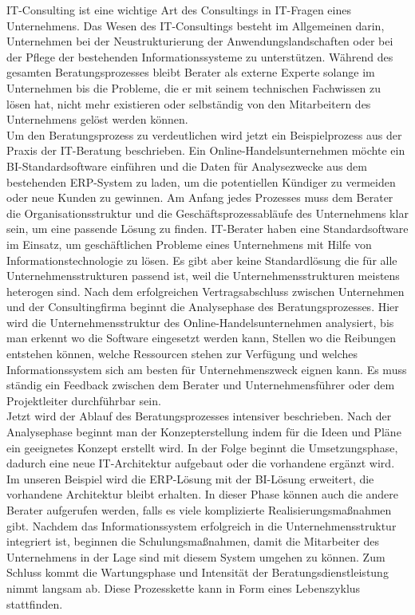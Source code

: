 	IT-Consulting ist eine wichtige Art des Consultings in IT-Fragen eines Unternehmens. Das Wesen des IT-Consultings besteht im Allgemeinen darin, Unternehmen bei der Neustrukturierung der Anwendungslandschaften oder bei der Pflege der bestehenden Informationssysteme zu unterstützen. Während des gesamten Beratungsprozesses bleibt Berater als externe Experte solange im Unternehmen bis die Probleme, die er mit seinem technischen Fachwissen zu lösen hat, nicht mehr existieren oder selbständig von den Mitarbeitern des Unternehmens gelöst werden können.\\
	Um den Beratungsprozess zu verdeutlichen wird jetzt ein Beispielprozess aus der Praxis der IT-Beratung beschrieben. Ein Online-Handelsunternehmen möchte ein BI-Standardsoftware einführen und die Daten für Analysezwecke aus dem bestehenden ERP-System zu laden, um die potentiellen Kündiger zu vermeiden oder neue Kunden zu gewinnen. Am Anfang jedes Prozesses muss dem Berater die Organisationsstruktur und die Geschäftsprozessabläufe des Unternehmens klar sein, um eine passende Lösung zu finden. IT-Berater haben eine Standardsoftware im Einsatz, um geschäftlichen Probleme eines Unternehmens mit Hilfe von Informationstechnologie zu lösen. Es gibt aber keine Standardlösung die für alle Unternehmensstrukturen passend ist, weil die Unternehmensstrukturen meistens heterogen sind. Nach dem erfolgreichen Vertragsabschluss zwischen Unternehmen und der Consultingfirma beginnt die Analysephase des Beratungsprozesses. Hier wird die Unternehmensstruktur des Online-Handelsunternehmen analysiert, bis man erkennt wo die Software eingesetzt werden kann, Stellen wo die Reibungen entstehen können, welche Ressourcen stehen zur Verfügung und welches Informationssystem sich am besten für Unternehmenszweck eignen kann. Es muss ständig ein Feedback zwischen dem Berater und Unternehmensführer oder dem Projektleiter durchführbar sein.\\
	Jetzt wird der Ablauf des Beratungsprozesses intensiver beschrieben. Nach der Analysephase beginnt man der Konzepterstellung indem für die Ideen und Pläne ein geeignetes Konzept erstellt wird. In der Folge beginnt die Umsetzungsphase, dadurch eine neue IT-Architektur aufgebaut oder die vorhandene ergänzt wird. Im unseren Beispiel wird die ERP-Lösung mit der BI-Lösung erweitert, die vorhandene Architektur bleibt erhalten. In dieser Phase können auch die andere Berater aufgerufen werden, falls es viele komplizierte Realisierungsmaßnahmen gibt.
	Nachdem das Informationssystem erfolgreich in die Unternehmensstruktur integriert ist, beginnen die Schulungsmaßnahmen, damit die Mitarbeiter des Unternehmens in der Lage sind mit diesem System umgehen zu können. Zum Schluss kommt die Wartungsphase und Intensität der Beratungsdienstleistung nimmt langsam ab. Diese Prozesskette kann in Form eines Lebenszyklus stattfinden.\\
